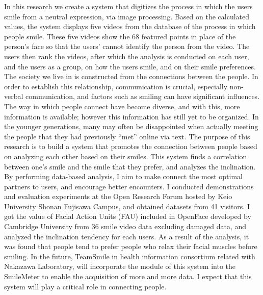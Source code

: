 \begin{eabstract}
  In this research we create a system that digitizes the process in which the users smile from a neutral expression, via image processing.
  Based on the calculated values,
  the system displays five videos from the database of the process in which people smile.
  These five videos show the 68 featured points in place of the person’s face
  so that the users’ cannot identify the person from the video.
  The users then rank the videos, after which the analysis is conducted on each user,
  and the users as a group, on how the users smile, and on their smile preferences.
  The society we live in is constructed from the connections between the people.
  In order to establish this relationship, communication is crucial, especially non-verbal communication,
  and factors such as smiling can have significant influences.
  The way in which people connect have become diverse, and with this, more information is available;
  however this information has still yet to be organized.
  In the younger generations,
  many may often be disappointed when actually meeting the people that they had previously “met” online via text.
  The purpose of this research is to build a system that promotes the connection between people based on analyzing each other based on their smiles.
  This system finds a correlation between one’s smile and the smile that they prefer, and analyzes the inclination.
  By performing data-based analysis, I aim to make connect the most optimal partners to users, and encourage better encounters.
  I conducted demonstrations and evaluation experiments at the Open Research Forum hosted by Keio University Shonan Fujisawa Campus,
  and obtained datasets from 41 visitors.
  I got the value of Facial Action Units (FAU) included in OpenFace developed by Cambridge University from 36 smile video data excluding damaged data,
  and analyzed the inclination tendency for each users.
  As a result of the analysis, it was found that people tend to prefer people who relax their facial muscles before smiling.
  In the future, TeamSmile in health information consortium related with Nakazawa Laboratory,
  will incorporate the module of this system into the SmileMeter to enable the acquisition of more and more data.
  I expect that this system will play a critical role in connecting people.

\end{eabstract}
